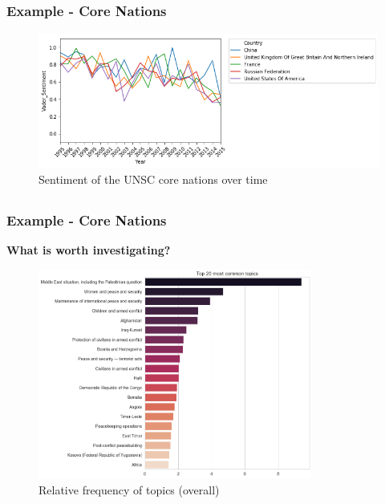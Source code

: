 \documentclass{beamer}
\begin{document}
\subsection{}
\begin{framefont}{\footnotesize}
	\begin{frame}
		\frametitle{Example - Core Nations}
		
		
		
		\begin{figure}
					\captionsetup{justification=centering}
					\includegraphics[trim={0cm 0cm 0cm 0.2cm},clip,width=11.5cm]{vadercore.png}
					\caption{Sentiment of the UNSC core nations over time}
			\end{figure}
			
		
	
	\end{frame}
\end{framefont}


\subsection{}
\begin{framefont}{\footnotesize}
	\begin{frame}
		\frametitle{Example - Core Nations}
		
		\textbf{What is worth investigating?}
		
		\begin{figure}
					\captionsetup{justification=centering}
					\includegraphics[trim={0cm 0cm 0cm 0cm},clip,width=9cm]{20most_common_topics.png}
					\caption{Relative frequency of topics (overall)}
			\end{figure}
		
	
	\end{frame}
\end{framefont}
\end{document}
